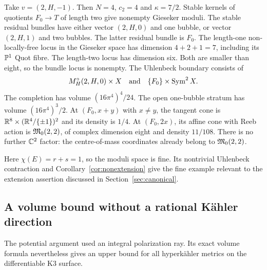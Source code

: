 \begin{example}\label{ex:eight}
Take $v=(2,H,-1)$. Then $N=4$, $c_2=4$ and $\kappa=7/2$.
Stable kernels of quotients $F_0\to T$ of length two give nonempty
Gieseker moduli. The stable residual bundles have either vector $(2,H,0)$ and one bubble,
or vector $(2,H,1)$ and two bubbles. The latter residual bundle is $F_0$.
The length-one non-locally-free locus in the Gieseker space has dimension
$4+2+1=7$, including its $\mathbb P^1$ Quot fibre. The length-two locus has
dimension six. Both are smaller than eight, so the bundle locus is
nonempty. The Uhlenbeck boundary consists of
\[
 M^{\circ}_H(2,H,0)\times X
 \quad\text{and}\quad \{F_0\}\times\operatorname{Sym}^2X.
\]
The completion has volume $(16\pi^4)^4/24$.
The open one-bubble stratum has volume $(16\pi^4)^3/2$.
At $(F_0,x+y)$ with $x\ne y$, the tangent cone is
$\mathbb R^8\times(\mathbb R^4/\{\pm1\})^2$ and its density is $1/4$.
At $(F_0,2x)$, its affine cone with Reeb action is
$\mathfrak M_0(2,2)$, of complex dimension eight and density $11/108$.
There is no further $\mathbb C^2$ factor: the centre-of-mass coordinates already
belong to $\mathfrak M_0(2,2)$.

Here $\chi(E)=r+s=1$, so the moduli space is fine. Its nontrivial
Uhlenbeck contraction and Corollary~\ref{cor:nonextension} give the fine
example relevant to the extension assertion discussed in
Section~\ref{sec:canonical}.
\end{example}

\subsection{A volume bound without a rational K\"ahler direction}
The potential argument used an integral polarization ray. Its exact volume
formula nevertheless gives an upper bound for all hyperk\"ahler metrics
on the differentiable K3 surface.


